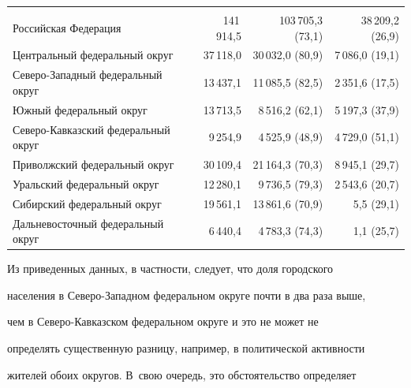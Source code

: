 \begin{table}
\begin{center}
\begin{tabular}{|l|r|r|r|}
\hline


&&&\\[-9pt]


Российская Федерация &141\,914,5&103\,705,3 (73,1)&38\,209,2 (26,9)\\


Центральный федеральный округ&37\,118,0&30\,032,0 (80,9)&7\,086,0 (19,1)\\


Северо-Западный федеральный округ&13\,437,1&11\,085,5 (82,5)&2\,351,6 (17,5)\\


Южный федеральный округ&13\,713,5&8\,516,2 (62,1)&5\,197,3 (37,9)\\


Северо-Кавказский федеральный округ&9\,254,9&4\,525,9 (48,9)&4\,729,0 (51,1)\\


Приволжский федеральный округ&30\,109,4&21\,164,3 (70,3)&8\,945,1 (29,7)\\


Уральский федеральный округ&12\,280,1&9\,736,5 (79,3)&2\,543,6 (20,7)\\


Сибирский федеральный округ&19\,561,1&13\,861,6 (70,9)&5,5 (29,1)\\


Дальневосточный федеральный округ&6\,440,4&4\,783,3 (74,3)&1,1 (25,7)\\


\hline


\end{tabular}


\end{center}


\vspace*{-12pt}


\end{table}





    Из приведенных данных, в частности, следует, что доля городского


населения в Северо-Западном федеральном округе почти в два раза выше,


чем в Се\-ве\-ро-Кав\-каз\-ском федеральном округе и это не может не


определять существенную разницу, например, в политической активности


жителей обоих округов. В~свою очередь, это обстоятельство определяет


